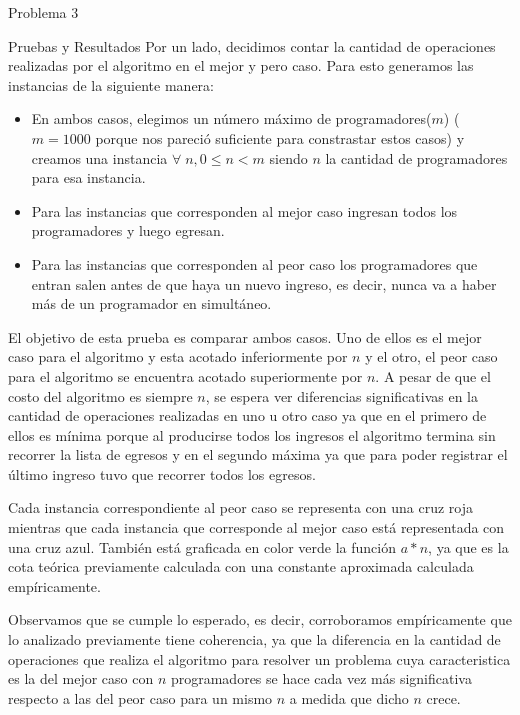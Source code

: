 \begin{section}{Problema 3}
\begin{subsection}{Pruebas y Resultados}
	Por un lado, decidimos contar la cantidad de operaciones realizadas por el algoritmo en el mejor y pero caso. Para esto generamos las instancias de la siguiente manera:
	\begin{itemize}
		\item En ambos casos, elegimos un número máximo de programadores($m$) ($m=1000$ porque nos pareció suficiente para constrastar estos casos) y creamos una instancia $\forall\;n,0\leq n < m$ siendo $n$ la cantidad de programadores para esa instancia.
		\item Para las instancias que corresponden al mejor caso ingresan todos los programadores y luego egresan.
		\item Para las instancias que corresponden al peor caso los programadores que entran salen antes de que haya un nuevo ingreso, es decir, nunca va a haber más de un programador en simultáneo.
	\end{itemize}

	El objetivo de esta prueba es comparar ambos casos. Uno de ellos es el mejor caso para el algoritmo y esta acotado inferiormente por $n$ y el otro, el peor caso para el algoritmo se encuentra acotado superiormente por $n$. A pesar de que el costo del algoritmo es siempre $n$, se espera ver diferencias significativas en la cantidad de operaciones realizadas en uno u otro caso ya que en el primero de ellos es mínima porque al producirse todos los ingresos el algoritmo termina sin recorrer la lista de egresos y en el segundo máxima ya que para poder registrar el último ingreso tuvo que recorrer todos los egresos.
	
	Cada instancia correspondiente al peor caso se representa con una cruz roja mientras que cada instancia que corresponde al mejor caso está representada con una cruz azul. También está graficada en color verde la función $a*n$, ya que es la cota teórica previamente calculada con una constante aproximada calculada empíricamente.\VSP
	
	\VSP

	Observamos que se cumple lo esperado, es decir, corroboramos empíricamente que lo analizado previamente tiene coherencia, ya que la diferencia en la cantidad de operaciones que realiza el algoritmo para resolver un problema cuya caracteristica es la del mejor caso con $n$ programadores se hace cada vez más significativa respecto a las del peor caso para un mismo $n$ a medida que dicho $n$ crece.\\
	

\end{subsection}
\end{section}

